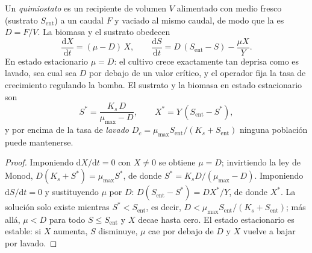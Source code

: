 \begin{theorem}[El quimiostato]\label{thm:b2:microbial-metabolism:chemostat}
Un \emph{quimiostato} es un recipiente de volumen $V$ alimentado con
medio fresco (sustrato $S_{\text{ent}}$) a un caudal $F$ y vaciado al
mismo caudal, de modo que la \emph{} es $D = F/V$. La
biomasa y el sustrato obedecen
\[
\frac{\mathrm{d}X}{\mathrm{d}t} = (\mu - D)\,X, \qquad
\frac{\mathrm{d}S}{\mathrm{d}t} = D\,(S_{\text{ent}} - S) - \frac{\mu X}{Y}.
\]
En estado estacionario $\mu = D$: el cultivo crece exactamente tan deprisa
como es lavado, sea cual sea $D$ por debajo de un valor crítico, y el
operador fija la tasa de crecimiento regulando la bomba. El sustrato y la
biomasa en estado estacionario son
\[
S^* = \frac{K_s\,D}{\mu_{\max} - D}, \qquad X^* = Y\,(S_{\text{ent}} - S^*),
\]
y por encima de la tasa de \emph{lavado} $D_c = \mu_{\max}
S_{\text{ent}}/(K_s + S_{\text{ent}})$ ninguna población puede mantenerse.
\end{theorem}
\begin{proof}
Imponiendo $\mathrm{d}X/\mathrm{d}t = 0$ con $X \neq 0$ se obtiene $\mu = D$;
invirtiendo la ley de Monod, $D(K_s + S^*) = \mu_{\max} S^*$, de donde $S^* =
K_s D/(\mu_{\max} - D)$. Imponiendo $\mathrm{d}S/\mathrm{d}t = 0$ y
sustituyendo $\mu$ por $D$: $D(S_{\text{ent}} - S^*) = DX^*/Y$, de donde
$X^*$. La solución solo existe mientras $S^* < S_{\text{ent}}$, es decir,
$D < \mu_{\max} S_{\text{ent}}/(K_s + S_{\text{ent}})$; más allá,
$\mu < D$ para todo $S \le S_{\text{ent}}$ y $X$ decae hasta cero. El
estado estacionario es estable: si $X$ aumenta, $S$ disminuye, $\mu$ cae
por debajo de $D$ y $X$ vuelve a bajar por lavado.
\end{proof}

